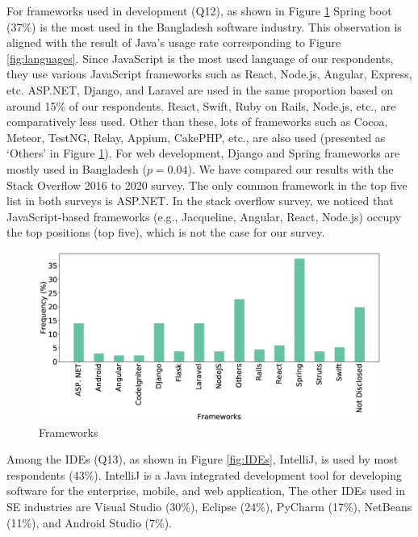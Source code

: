 For frameworks used in development (Q12), as shown in Figure \ref{fig:frameworks} Spring boot (37\%) is the most used in the Bangladesh software industry. 
This observation is aligned with the result of Java's usage rate corresponding
to Figure \ref{fig:languages}. Since JavaScript is the most used language of our
respondents, they use various JavaScript frameworks such as React, Node.js,
Angular, Express, etc. ASP.NET, Django, and
Laravel are used in the same proportion based on around 15\% of our respondents.
React, Swift, Ruby on Rails, Node.js, etc., are comparatively less used. Other
than these, lots of frameworks such as Cocoa, Meteor, TestNG, Relay, Appium,
CakePHP, etc., are also used (presented as `Others' in Figure \ref{fig:frameworks}). For web development, Django
and Spring frameworks are mostly used in Bangladesh ($p=0.04$). We have compared
our results with the Stack Overflow 2016 to 2020
survey\citep{StackoverflowSurvey2017, StackoverflowSurvey2018,
StackoverflowSurvey2019, StackoverflowSurvey2020}. The only common framework in
the top five list in both surveys is ASP.NET. In the stack overflow survey, we
noticed that JavaScript-based frameworks (e.g., Jacqueline, Angular, React,
Node.js) occupy the top positions (top five), which is not the case for our
survey.

\begin{figure}[t]
\centering
  \includegraphics[scale=0.18]{Figures/Respondents_frameworks}
  \caption{Frameworks}
  \label{fig:frameworks}
\end{figure}

Among the IDEs (Q13), as shown in Figure \ref{fig:IDEs},
IntelliJ, is used by most respondents (43\%). IntelliJ is a Java integrated development tool for developing software for the
enterprise, mobile, and web application, The
other IDEs used in SE industries are Visual Studio (30\%), Eclipse (24\%),
PyCharm (17\%), NetBeans (11\%), and Android Studio (7\%).

